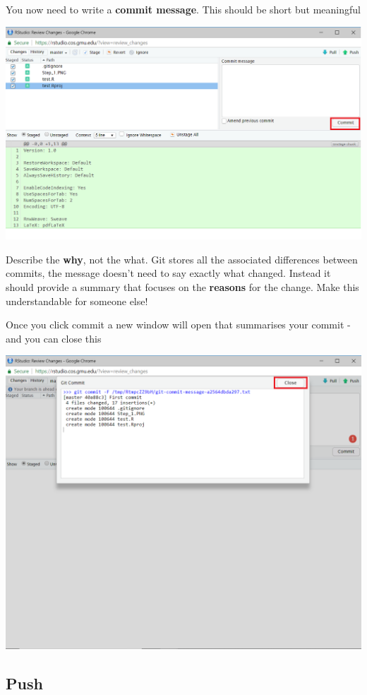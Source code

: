 \documentclass[
]{book}
\begin{document}
You now need to write a \textbf{commit message}. This should be short but meaningful

\includegraphics[width=17.38in]{images/stage_step_5}

Describe the \textbf{why}, not the what. Git stores all the associated differences between commits, the message doesn't need to say exactly what changed. Instead it should provide a summary that focuses on the \textbf{reasons} for the change. Make this understandable for someone else!

Once you click commit a new window will open that summarises your commit - and you can close this

\includegraphics[width=17.36in]{images/stage_step_6}

\hypertarget{push}{%
\subsection{Push}\label{push}}
\end{document}
